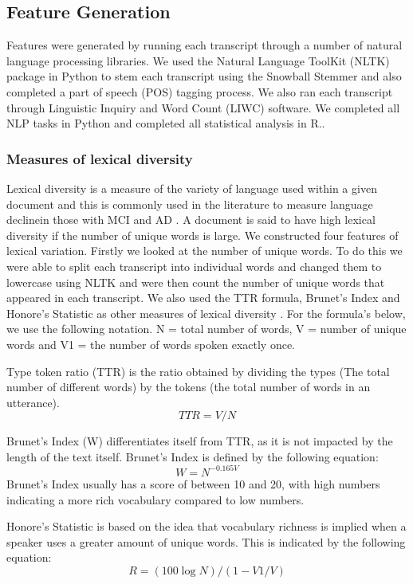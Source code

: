 \documentclass[12pt]{article}
\begin{document}
\subsection{Feature Generation}
Features were generated by running each transcript through a number of natural language processing libraries. We used the Natural Language ToolKit (NLTK) package \cite{Bird2009} in Python to stem each transcript using the Snowball Stemmer and also completed a part of speech (POS) tagging process. We also ran each transcript through Linguistic Inquiry and Word Count (LIWC) \cite{Pennebaker2015} software. We completed all NLP tasks in Python and completed all statistical analysis in R.. 
\par 
\subsubsection{Measures of lexical diversity}
Lexical diversity is a measure of the variety of language used within a given document and this is commonly used in the literature to measure language declinein those with MCI and AD \cite{Bucks2000, Le2012}. A document is said to have high lexical diversity if the number of unique words is large. We constructed four features of lexical variation. Firstly we looked at the number of unique words. To do this we were able to split each transcript into individual words and changed them to lowercase using NLTK and were then count the number of unique words that appeared in each transcript. We also used the TTR formula, Brunet's Index and Honore's Statistic as other measures of lexical diversity \cite{Bucks2000}. For the formula's below, we use the following notation. N = total number of words, V = number of unique words and V1 = the number of words spoken exactly once.
\par 
Type token ratio (TTR) is the ratio obtained by dividing the types (The total number of different words) by the tokens (the total number of words in an utterance).
\begin{equation} \label{x1}
TTR = V / N
\end{equation}
\par 
Brunet's Index (W) differentiates itself from TTR, as it is not impacted by the length of the text itself. Brunet's Index is defined by the following equation:
\begin{equation} \label{x2}
W = N^{-0.165V}
\end{equation}
 Brunet's Index usually has a score of between 10 and 20, with high numbers indicating a more rich vocabulary compared to low numbers. \newline
\par 
Honore's Statistic is based on the idea that vocabulary richness is implied when a speaker uses a greater amount of unique words. This is indicated by the following equation: 
\begin{equation} \label{x3}
R = (100 \log N) / (1 - V1/V)
\end{equation}
\end{document}
